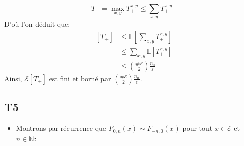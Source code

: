 \documentclass[a4paper,11pt]{article}
\def \E{\mathcal{E}}
\def \esp{\mathbb{E}}
\begin{document}
\[ T_+ = \max_{x,y}  T_+^{x,y} \le \sum_{x,y} T_+^{x,y} \] 
D'où l'on déduit que:
\begin{equation*}
\begin{split}
\mathbb{E}[T_+] & \le \esp[\sum_{x,y} T_+^{x,y}] \\
		& \le \sum_{x,y} \esp[T_+^{x,y}]  \\
		& \le \binom{\# \E}{2} \frac{n_0}{\varepsilon} 
\end{split}
\end{equation*}
\underline{Ainsi, $\E[T_+]$ est fini et borné par $\binom{\# \E}{2} \frac{n_0}{\epsilon}$.}

\subsection*{T5}
\begin{itemize}

\item[\textbullet]
Montrons par récurrence que $F_{0,n}(x) \sim F_{-n,0}(x)$ pour tout $x \in \E$ et $n \in \mathbb{N}$:


\end{itemize}
\end{document}
